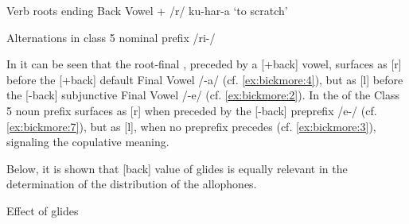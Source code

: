 \documentclass[output=paper
,newtxmath
,modfonts
,nonflat]{langsci/langscibook}
\begin{document}
\ea\label{ex:bickmore:10}
Verb roots ending Back Vowel + /r/ 
\ea\label{ex:bickmore:10a}
ku-har-a  ‘to scratch’%
%
\ex\label{ex:bickmore:10b}
\ex\label{ex:bickmore:10c}
\ex\label{ex:bickmore:10d}
\ex\label{ex:bickmore:10e}
\ex\label{ex:bickmore:10f}
\z
\z

\ea\label{ex:bickmore:11}
Alternations in class 5 nominal prefix /ri-/ 
\ea\label{ex:bickmore:11a}
\ex\label{ex:bickmore:11b}
\ex\label{ex:bickmore:11c}
\ex\label{ex:bickmore:11d}
\ex\label{ex:bickmore:11e}
\ex\label{ex:bickmore:11f}
\z
\z

In  it can be seen that the root-final , preceded by a [+back] vowel, surfaces as [r] before the [+back] default Final Vowel /-a/ (cf. \ref{ex:bickmore:4}), but as [l] before the [-back] subjunctive Final Vowel /-e/ (cf. \ref{ex:bickmore:2}). In  the  of the Class 5 noun prefix surfaces as [r] when preceded by the [-back] preprefix /e-/ (cf. \ref{ex:bickmore:7}), but as [l], when no preprefix precedes (cf. \ref{ex:bickmore:3}), signaling the copulative meaning. 

Below, it is shown that [back] value of glides is equally relevant in the determination of the distribution of the  allophones. 

\ea\label{ex:bickmore:12}
Effect of glides
\ea\label{ex:bickmore:12a}
\ex\label{ex:bickmore:12b}
\ex\label{ex:bickmore:12c}
\ex\label{ex:bickmore:12d}
\ex\label{ex:bickmore:12e}
\ex\label{ex:bickmore:12f}
\ex\label{ex:bickmore:12g}
\ex\label{ex:bickmore:12h}
\z
\z
%
\end{document}

